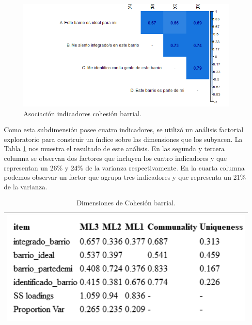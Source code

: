 \documentclass[
  12pt,
]{book}
\begin{document}
\begin{figure}[H]

{\centering \includegraphics[width=1\linewidth,height=1\textheight]{output/graphs/cohesion-barrial_cor} 

}

\caption{Asociación indicadores cohesión barrial.}\label{fig:cohesion-barrial-cor}
\end{figure}

Como esta subdimensión posee cuatro indicadores, se utilizó un análisis factorial exploratorio para construir un índice sobre las dimensiones que los subyacen. La Tabla \ref{tab:cohesion-barrial-fa} nos muestra el resultado de este análisis. En las segunda y tercera columna se observan dos factores que incluyen los cuatro indicadores y que representan un 26\% y 24\% de la varianza respectivamente. En la cuarta columna podemos observar un factor que agrupa tres indicadores y que representa un 21\% de la varianza.

\begin{longtable}[]{@{}l@{}}
\caption{\label{tab:cohesion-barrial-fa}Dimensiones de Cohesión barrial.}\tabularnewline
\toprule
\endhead
\includegraphics[width=5.20833in,height=\textheight]{output/tables/cohesion_barrial_fa.png} \\
\bottomrule
\end{longtable}
\end{document}
